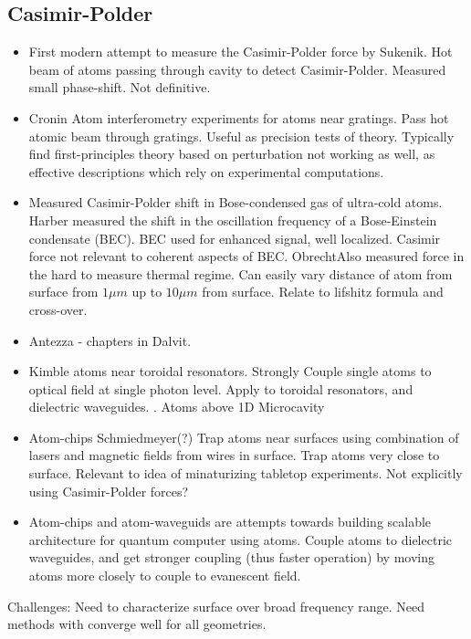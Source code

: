 \begin{itemize}
\subsection{Casimir-Polder}
\begin{itemize}
\item First modern attempt to measure the Casimir-Polder force by Sukenik\etal\cite{Sukenik1993}.
  Hot beam of atoms passing through cavity to detect Casimir-Polder.  
  Measured small phase-shift.  Not definitive. 
\item Cronin \cite{Perreault2005,Lonij2009}  Atom interferometry experiments for atoms near gratings.
  Pass hot atomic beam through gratings.  Useful as precision tests of theory.  
  Typically find first-principles theory based on perturbation not working as well,
  as effective descriptions which rely on experimental computations.  
\item Measured Casimir-Polder shift in Bose-condensed gas of ultra-cold atoms.
  Harber\etal\cite{Harber2005} measured the shift in the oscillation frequency
  of a Bose-Einstein condensate (BEC).  BEC used for enhanced signal, well localized.
  Casimir force not relevant to coherent aspects of BEC.
  Obrecht\etal\cite{Obrecht2007}Also measured force in the hard to measure thermal regime.  
  Can easily vary distance of atom from surface from $1\mu m$ up to $10\mu m$ from surface.
  Relate to lifshitz formula and cross-over.    
\item Antezza - chapters in Dalvit.  
\item Kimble atoms near toroidal resonators.
  Strongly Couple single atoms to optical field at single photon level.  
  Apply to toroidal resonators, and dielectric waveguides.  
  \cite{Alton2011}.
  Atoms above 1D Microcavity \cite{Hung2013}
\item Atom-chips  Schmiedmeyer\cite{Folman2000,Schneider2003}(?)  
  Trap atoms near surfaces using combination of lasers and magnetic fields from
  wires in surface.  Trap atoms very close to surface.  Relevant to idea of 
  minaturizing tabletop experiments.  
  Not explicitly using Casimir-Polder forces?  
\item Atom-chips and atom-waveguids are attempts towards building scalable 
architecture for quantum computer using atoms.
Couple atoms to dielectric waveguides, and get stronger coupling (thus faster operation)
by moving atoms more closely to couple to evanescent field.  
\end{itemize}
Challenges:  Need to characterize surface over broad frequency range.
Need methods with converge well for all geometries.  


\end{itemize}
